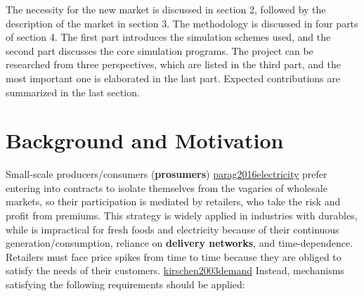 \documentclass[letterpaper,8pt,twocolumn,twoside,]{pinp}
\begin{document}
The necessity for the new market is discussed in section 2, followed by
the description of the market in section 3. The methodology is discussed
in four parts of section 4. The first part introduces the simulation
schemes used, and the second part discusses the core simulation
programs. The project can be researched from three perspectives, which
are listed in the third part, and the most important one is elaborated
in the last part. Expected contributions are summarized in the last
section.

\hypertarget{background-and-motivation}{%
\section{Background and Motivation}\label{background-and-motivation}}

Small-scale producers/consumers (\textbf{prosumers})
\protect\hyperlink{reference}{parag2016electricity} prefer entering into
contracts to isolate themselves from the vagaries of wholesale markets,
so their participation is mediated by retailers, who take the risk and
profit from premiums. This strategy is widely applied in industries with
durables, while is impractical for fresh foods and electricity because
of their continuous generation/consumption, reliance on \textbf{delivery
networks}, and time-dependence. Retailers must face price spikes from
time to time because they are obliged to satisfy the needs of their
customers. \protect\hyperlink{reference}{kirschen2003demand} Instead,
mechanisms satisfying the following requirements should be applied:
\end{document}

